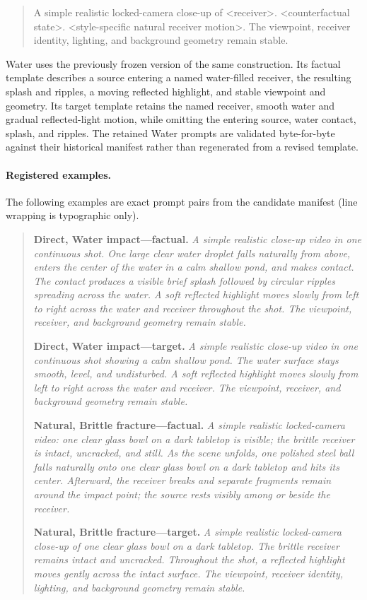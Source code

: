 \begin{quote}\footnotesize\ttfamily\raggedright
A simple realistic locked-camera close-up of <receiver>.
<counterfactual state>. <style-specific natural receiver motion>.
The viewpoint, receiver identity, lighting, and background geometry remain
stable.
\end{quote}

Water uses the previously frozen version of the same construction.  Its
factual template describes a source entering a named water-filled receiver,
the resulting splash and ripples, a moving reflected highlight, and stable
viewpoint and geometry.  Its target template retains the named receiver,
smooth water and gradual reflected-light motion, while omitting the entering
source, water contact, splash, and ripples.  The retained Water prompts are
validated byte-for-byte against their historical manifest rather than
regenerated from a revised template.

\paragraph{Registered examples.}
The following examples are exact prompt pairs from the candidate manifest
(line wrapping is typographic only).

\begin{quote}\small
\textbf{Direct, Water impact---factual.}
\emph{A simple realistic close-up video in one continuous shot. One large
clear water droplet falls naturally from above, enters the center of the water
in a calm shallow pond, and makes contact. The contact produces a visible
brief splash followed by circular ripples spreading across the water. A soft
reflected highlight moves slowly from left to right across the water and
receiver throughout the shot. The viewpoint, receiver, and background
geometry remain stable.}

\textbf{Direct, Water impact---target.}
\emph{A simple realistic close-up video in one continuous shot showing a calm
shallow pond. The water surface stays smooth, level, and undisturbed. A soft
reflected highlight moves slowly from left to right across the water and
receiver. The viewpoint, receiver, and background geometry remain stable.}

\textbf{Natural, Brittle fracture---factual.}
\emph{A simple realistic locked-camera video: one clear glass bowl on a dark
tabletop is visible; the brittle receiver is intact, uncracked, and still. As
the scene unfolds, one polished steel ball falls naturally onto one clear
glass bowl on a dark tabletop and hits its center. Afterward, the receiver
breaks and separate fragments remain around the impact point; the source rests
visibly among or beside the receiver.}

\textbf{Natural, Brittle fracture---target.}
\emph{A simple realistic locked-camera close-up of one clear glass bowl on a
dark tabletop. The brittle receiver remains intact and uncracked. Throughout
the shot, a reflected highlight moves gently across the intact surface. The
viewpoint, receiver identity, lighting, and background geometry remain
stable.}
\end{quote}

